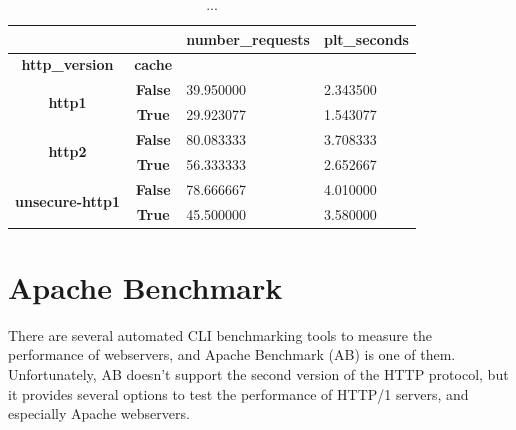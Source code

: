 \documentclass[a4paper,10pt]{article}
\begin{document}
\begin{table}[h!]
\centering
\begin{tabular}{|c|c|l|l|}
\hline
\multicolumn{1}{|r|}{\textbf{}}          & \multicolumn{1}{r|}{\textbf{}} & \multicolumn{1}{r|}{\textbf{number\_requests}} & \multicolumn{1}{r|}{\textbf{plt\_seconds}} \\ \hline
\textbf{http\_version}                   & \textbf{cache}                 & \multicolumn{1}{c|}{\textbf{}}                 & \multicolumn{1}{c|}{\textbf{}}             \\ \hline
\multirow{2}{*}{\textbf{http1}}          & \textbf{False}                 & 39.950000                                      & 2.343500                                   \\ \cline{2-4} 
                                         & \textbf{True}                  & 29.923077                                      & 1.543077                                   \\ \hline
\multirow{2}{*}{\textbf{http2}}          & \textbf{False}                 & 80.083333                                      & 3.708333                                   \\ \cline{2-4} 
                                         & \textbf{True}                  & 56.333333                                      & 2.652667                                   \\ \hline
\multirow{2}{*}{\textbf{unsecure-http1}} & \textbf{False}                 & 78.666667                                      & 4.010000                                   \\ \cline{2-4} 
                                         & \textbf{True}                  & 45.500000                                      & 3.580000                                   \\ \hline
\end{tabular}

\caption{...}
\label{fig:table2}
\end{table}


\clearpage



\section{Apache Benchmark}

There are several automated CLI benchmarking tools to measure the performance of webservers, and Apache Benchmark (AB) is one of them. Unfortunately, AB doesn't support the second version of the HTTP protocol, but it provides several options to test the performance of HTTP/1 servers, and especially Apache webservers.
\end{document}
